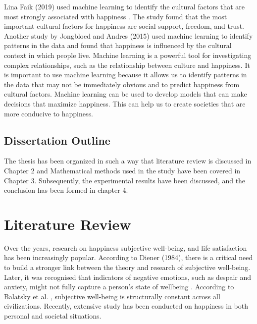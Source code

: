 \documentclass[12pt, a4paper, twoside]{report}
\theoremstyle{plain} %
\theoremstyle{definition} %
\theoremstyle{remark} %
\numberwithin{equation}{chapter}
\begin{document}
Lina Faik (2019) used machine learning to identify the cultural factors that are most strongly associated with happiness \cite{faik2019cultural}. The study found that the most important cultural factors for happiness are social support, freedom, and trust. Another study by Jongbloed and Andres (2015) \cite{jongbloed2015happiness} used machine learning to identify patterns in the data and found that happiness is influenced by the cultural context in which people live.
Machine learning is a powerful tool for investigating complex relationships, such as the relationship between culture and happiness. It is important to use machine learning because it allows us to identify patterns in the data that may not be immediately obvious and to predict happiness from cultural factors. Machine learning can be used to develop models that can make decisions that maximize happiness. This can help us to create societies that are more conducive to happiness.


\section{Dissertation Outline}
The thesis has been organized in such a way that literature review is discussed in Chapter 2 and
Mathematical methods used in the study have been covered in Chapter 3. Subsequently, the experimental results have been discussed, and the conclusion has been formed in chapter 4.


\chapter{Literature Review}\label{ch:2}

Over the years, research on happiness subjective well-being, and life satisfaction has been increasingly popular. According to Diener (1984), there is a critical need to build a stronger link between the theory and research of subjective well-being. Later, it was recognised that indicators of negative emotions, such as despair and anxiety, might not fully capture a person's state of wellbeing \cite{diener1995factors}. According to Balatsky et al. \cite{balatsky1993subjective}, subjective well-being is structurally constant across all civilizations. Recently, extensive study has been conducted on happiness in both personal and societal situations.\\
\end{document}
